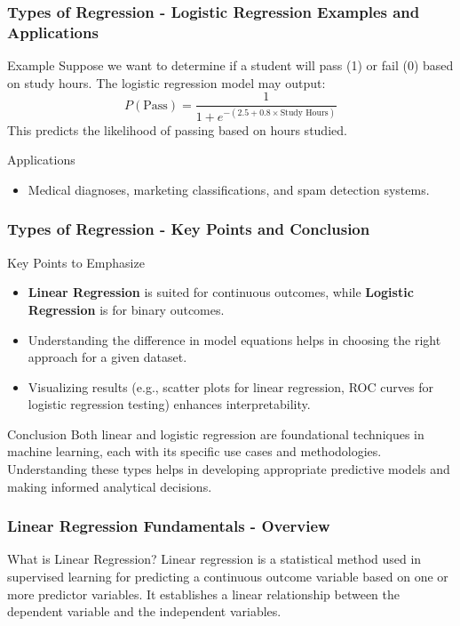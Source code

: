 \documentclass[aspectratio=169]{beamer}
\begin{document}
\begin{frame}[fragile]
\frametitle{Types of Regression - Logistic Regression Examples and Applications}
\begin{block}{Example}
Suppose we want to determine if a student will pass (1) or fail (0) based on study hours. The logistic regression model may output:
\begin{equation}
P(\text{Pass}) = \frac{1}{1 + e^{-(2.5 + 0.8 \times \text{Study Hours})}}
\end{equation}
This predicts the likelihood of passing based on hours studied.
\end{block}

\begin{block}{Applications}
\begin{itemize}
    \item Medical diagnoses, marketing classifications, and spam detection systems.
\end{itemize}
\end{block}
\end{frame}

\begin{frame}[fragile]
\frametitle{Types of Regression - Key Points and Conclusion}
\begin{block}{Key Points to Emphasize}
\begin{itemize}
    \item \textbf{Linear Regression} is suited for continuous outcomes, while \textbf{Logistic Regression} is for binary outcomes.
    \item Understanding the difference in model equations helps in choosing the right approach for a given dataset.
    \item Visualizing results (e.g., scatter plots for linear regression, ROC curves for logistic regression testing) enhances interpretability.
\end{itemize}
\end{block}

\begin{block}{Conclusion}
Both linear and logistic regression are foundational techniques in machine learning, each with its specific use cases and methodologies. Understanding these types helps in developing appropriate predictive models and making informed analytical decisions.
\end{block}
\end{frame}

\begin{frame}[fragile]
  \frametitle{Linear Regression Fundamentals - Overview}
  \begin{block}{What is Linear Regression?}
    Linear regression is a statistical method used in supervised learning for predicting a continuous outcome variable based on one or more predictor variables. It establishes a linear relationship between the dependent variable and the independent variables.
  \end{block}
\end{frame}
\end{document}
